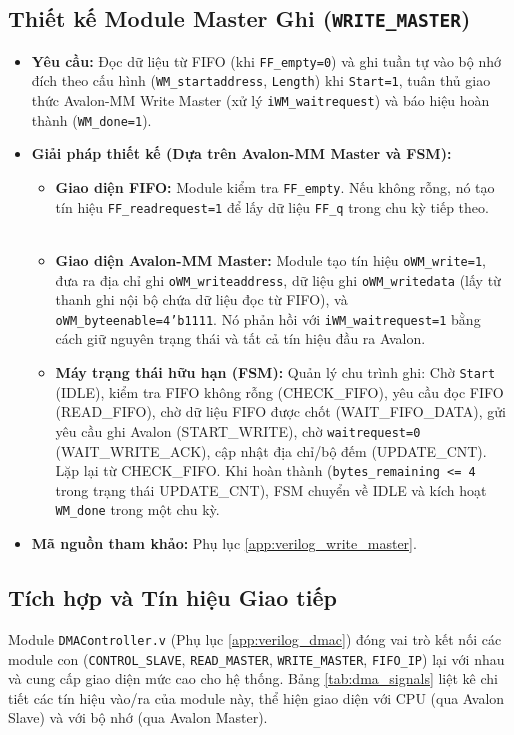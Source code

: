 \subsection{Thiết kế Module Master Ghi (\texttt{WRITE\_MASTER})}
\begin{itemize}
    \item \textbf{Yêu cầu:} Đọc dữ liệu từ FIFO (khi \texttt{FF\_empty=0}) và ghi tuần tự vào bộ nhớ đích theo cấu hình (\texttt{WM\_startaddress}, \texttt{Length}) khi \texttt{Start=1}, tuân thủ giao thức Avalon-MM Write Master (xử lý \texttt{iWM\_waitrequest}) và báo hiệu hoàn thành (\texttt{WM\_done=1}).
    \item \textbf{Giải pháp thiết kế (Dựa trên Avalon-MM Master và FSM):}
        \begin{itemize}
            \item \textbf{Giao diện FIFO:} Module kiểm tra \texttt{FF\_empty}. Nếu không rỗng, nó tạo tín hiệu \texttt{FF\_readrequest=1} để lấy dữ liệu \texttt{FF\_q} trong chu kỳ tiếp theo.
            \item \textbf{Giao diện Avalon-MM Master:} Module tạo tín hiệu \texttt{oWM\_write=1}, đưa ra địa chỉ ghi \texttt{oWM\_writeaddress}, dữ liệu ghi \texttt{oWM\_writedata} (lấy từ thanh ghi nội bộ chứa dữ liệu đọc từ FIFO), và \texttt{oWM\_byteenable=4'b1111}. Nó phản hồi với \texttt{iWM\_waitrequest=1} bằng cách giữ nguyên trạng thái và tất cả tín hiệu đầu ra Avalon.
            \item \textbf{Máy trạng thái hữu hạn (FSM):} Quản lý chu trình ghi: Chờ \texttt{Start} (IDLE), kiểm tra FIFO không rỗng (CHECK\_FIFO), yêu cầu đọc FIFO (READ\_FIFO), chờ dữ liệu FIFO được chốt (WAIT\_FIFO\_DATA), gửi yêu cầu ghi Avalon (START\_WRITE), chờ \texttt{waitrequest=0} (WAIT\_WRITE\_ACK), cập nhật địa chỉ/bộ đếm (UPDATE\_CNT). Lặp lại từ CHECK\_FIFO. Khi hoàn thành (\texttt{bytes\_remaining <= 4} trong trạng thái UPDATE\_CNT), FSM chuyển về IDLE và kích hoạt \texttt{WM\_done} trong một chu kỳ.
        \end{itemize}
    \item \textbf{Mã nguồn tham khảo:} Phụ lục \ref{app:verilog_write_master}.
\end{itemize}

\subsection{Tích hợp và Tín hiệu Giao tiếp}
Module \texttt{DMAController.v} (Phụ lục \ref{app:verilog_dmac}) đóng vai trò kết nối các module con (\texttt{CONTROL\_SLAVE}, \texttt{READ\_MASTER}, \texttt{WRITE\_MASTER}, \texttt{FIFO\_IP}) lại với nhau và cung cấp giao diện mức cao cho hệ thống. Bảng \ref{tab:dma_signals} liệt kê chi tiết các tín hiệu vào/ra của module này, thể hiện giao diện với CPU (qua Avalon Slave) và với bộ nhớ (qua Avalon Master).

